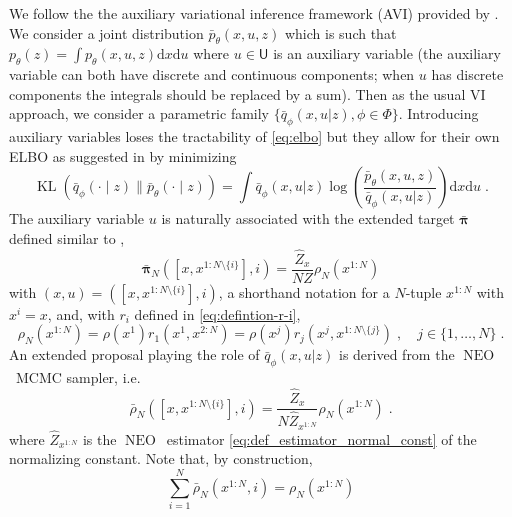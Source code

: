 \documentclass{article}
\def\IFIS{\ensuremath{\operatorname{NEO}}}
\def\rmd{\operatorname{d}\hspace{-2pt}}
\def\rmd{\mathrm{d}}
\def\eqsp{\,}
\def\eqsp{\;}
\newcommand{\1}{\mathds{1}}
\def\proposal{\rho}
\newcommand{\chunku}[3]{#1^{#2:#3}}
\newcommand{\chunkum}[4]{#1^{#2:#3 \setminus \{#4\}}}
\def\const{Z}
\newcommand{\estConstC}[1]{\widehat{Z}_{#1}}
\def\measpi{\boldsymbol{\pi}}
\def\rmd{\mathrm{d}}
\def\obs{z}
\begin{document}
We follow the the auxiliary variational inference framework (AVI) provided by \cite{agakov2004auxiliary}.
We consider a joint distribution $\bar{p}_\theta(x,u,\obs)$ which is such that $p_\theta(\obs)= \int p_\theta(x,u,\obs) \rmd x \rmd u$  where $u \in \mathsf{U}$ is an auxiliary variable (the auxiliary variable can both have discrete and continuous components; when $u$ has discrete components the integrals should be replaced by a sum). Then as the usual VI approach, we consider a parametric family $\{\bar{q}_\phi(x,u|\obs), \phi \in \Phi\}$.
Introducing auxiliary variables loses the tractability of \eqref{eq:elbo} but they allow for their own ELBO as suggested in \cite{agakov2004auxiliary,lawson2019energy} by minimizing 
\begin{equation}\label{eq:AVI_ELBO}
\operatorname{KL}(\bar{q}_\phi(\cdot\mid \obs) \| \bar{p}_\theta(\cdot\mid \obs) ) = \int \bar{q}_\phi(x,u|\obs) \log \left( \frac{\bar{p}_\theta(x,u,\obs)}{\bar{q}_\phi(x,u|\obs)} \right)  \rmd x \rmd u \eqsp.
\end{equation}
 The auxiliary variable $u$ is naturally associated with the extended target $\bar{\measpi}$ defined similar to , 
 \begin{equation}
\label{eq:extended-target}
\bar{\measpi}_N([x,\chunkum{x}{1}{N}{i}],i)= \frac{\estConstC{x}}{N \const} \proposal_N(\chunku{x}{1}{N})
 \end{equation}
 with $(x,u)=([x,\chunkum{x}{1}{N}{i}],i)$,  a shorthand notation for a $N$-tuple $\chunku{x}{1}{N}$ with $x^i= x$,  and, with $r_i$ defined in \eqref{eq:defintion-r-i}, 
\begin{equation}
\label{eq:definition-proposal}
\proposal_N(\chunku{x}{1}{N})= \proposal(x^1) r_1(x^1,\chunku{x}{2}{N}) = \proposal(x^j) r_j(x^j, \chunkum{x}{1}{N}{j}) \eqsp, \quad j \in \{1,\dots,N\}  \eqsp. 
\end{equation}
An extended proposal playing the role of $ \bar{q}_\phi(x,u|\obs)$ is derived from the \IFIS~MCMC sampler, i.e.
\begin{equation}
\label{eq:proposal-extended}
\bar{\proposal}_N([x,\chunkum{x}{1}{N}{i}],i)=  \frac{\estConstC{x}}{N \estConstC{\chunku{x}{1}{N}}} \proposal_N(\chunku{x}{1}{N})  \eqsp.
\end{equation}
where $\estConstC{\chunku{x}{1}{N}}$ is the \IFIS\ estimator \eqref{eq:def_estimator_normal_const} of the normalizing constant.
Note that, by construction,
\begin{equation}
\label{eq:expression-marginal}
\sum_{i=1}^N  \bar{\proposal}_N(\chunku{x}{1}{N},i) = \proposal_N(\chunku{x}{1}{N})
\end{equation}
\end{document}
